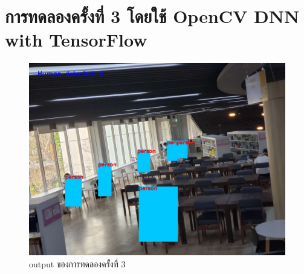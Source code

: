 \section{การทดลองครั้งที่ 3 โดยใช้ OpenCV DNN with TensorFlow}
\begin{figure}[h]
    \centering
    \includegraphics[scale=0.25]{images/dnn_output.jpg}
    \caption[output]{output ของการทดลองครั้งที่ 3}
    \label{fig:output3}
\end{figure}
